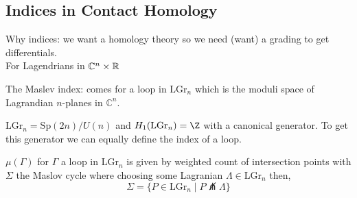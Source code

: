 \documentclass[12pt]{extarticle}
\newcommand{\C}{\mathbb{C}}
\newcommand{\Sp}{\mathrm{Sp}}
\begin{document}
\subsection{Indices in Contact Homology}

Why indices: we want a homology theory so we need (want) a grading to get differentials.
\bigskip\\
For Lagendrians in $\C^n \times \R$

\newcommand{\LGr}{\mathrm{LGr}}

\begin{defn}
The Maslev index: comes for a loop in $\mathrm{LGr}_n$ which is the moduli space of Lagrandian $n$-planes in $\C^n$.
\end{defn}

\begin{rmk}
$\LGr_n = \Sp(2n)/U(n)$ and
$ H_1(\LGr_n) = \Z$ with a canonical generator. To get this generator we can equally define the index of a loop.
\end{rmk}

\begin{defn}
$\mu(\Gamma)$ for $\Gamma$ a loop in $\LGr_n$ is given by weighted count of intersection points with $\Sigma$ the Maslov cycle where choosing some Lagranian $\Lambda \in \LGr_n$ then,
\[ \Sigma  = \{ P \in \LGr_n \mid P \not\pitchfork \Lambda \} \]
\end{defn}
\end{document}
